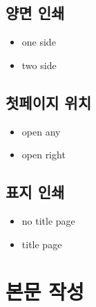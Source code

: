 \documentclass[12pt, a4paper, oneside]{book}
\let\stdsection\section
\renewcommand\section{\newpage\stdsection}
\begin{document}
	\newpage  \null
	\section{양면 인쇄}
	\null
	
			\begin{itemize}
			\item one side
			\item two side
			\end{itemize}

	\newpage  \null
	\section{첫페이지 위치}
	\null
	
			\begin{itemize}
			\item open any
			\item open right
			\end{itemize}
	
	\newpage  \null
	\section{표지 인쇄}
	\null
	
			\begin{itemize}
			\item no title page
			\item title page
			\end{itemize}























			
			
	\chapter{본문 작성}
					
\end{document}
